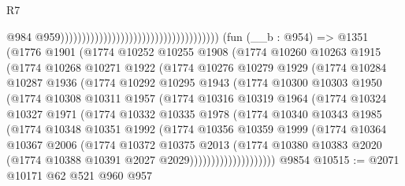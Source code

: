 \begin{lexlean}{R7}
\begin{coremodule}
                                                                              @984
                                                                              @959)))))))))))))))))))))))))))))))))))))
    (fun (__b : @954) =>
    @1351
      (@1776
        @1901
        (@1774
          @10252
          @10255
          @1908
          (@1774
            @10260
            @10263
            @1915
            (@1774
              @10268
              @10271
              @1922
              (@1774
                @10276
                @10279
                @1929
                (@1774
                  @10284
                  @10287
                  @1936
                  (@1774
                    @10292
                    @10295
                    @1943
                    (@1774
                      @10300
                      @10303
                      @1950
                      (@1774
                        @10308
                        @10311
                        @1957
                        (@1774
                          @10316
                          @10319
                          @1964
                          (@1774
                            @10324
                            @10327
                            @1971
                            (@1774
                              @10332
                              @10335
                              @1978
                              (@1774
                                @10340
                                @10343
                                @1985
                                (@1774
                                  @10348
                                  @10351
                                  @1992
                                  (@1774
                                    @10356
                                    @10359
                                    @1999
                                    (@1774
                                      @10364
                                      @10367
                                      @2006
                                      (@1774
                                        @10372
                                        @10375
                                        @2013
                                        (@1774
                                          @10380
                                          @10383
                                          @2020
                                          (@1774 @10388 @10391 @2027 @2029))))))))))))))))))))
    @9854
@10515 := @2071 @10171 @62 @521 @960 @957

\end{coremodule}
\end{lexlean}
